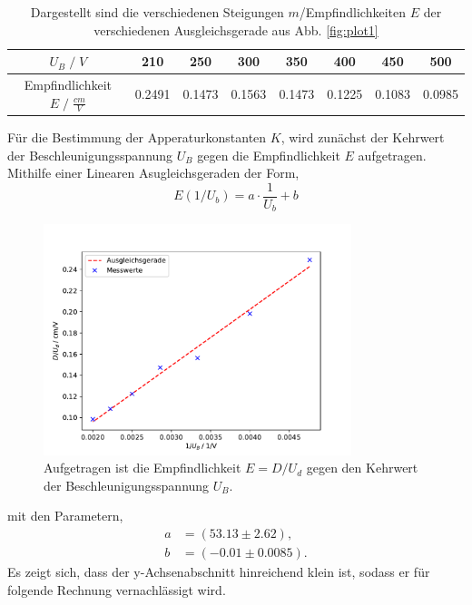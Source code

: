 \begin{table}
    \centering
    \begin{tabular}{c | c c c c c c c}
        \toprule
        $U_B\;/\;V$&210&250&300&350&400&450&500\\
        \midrule
        Empfindlichkeit $E\;/\;\frac{cm}{V}$& 0.2491& 0.1473& 0.1563& 0.1473& 0.1225& 0.1083& 0.0985\\
        \bottomrule
    \end{tabular}
    \caption{Dargestellt sind die verschiedenen Steigungen $m$/Empfindlichkeiten $E$ der verschiedenen 
    Ausgleichsgerade aus Abb. \ref{fig:plot1}}
    \label{tab:tab1}
\end{table}
\newpage
Für die Bestimmung der Apperaturkonstanten $K$, wird zunächst der Kehrwert der Beschleunigungsspannung $U_B$
gegen die Empfindlichkeit $E$ aufgetragen. Mithilfe einer Linearen Asugleichsgeraden der Form,
\begin{equation}
    E(1/U_b) = a\cdot \frac{1}{U_b} + b  \nonumber
\end{equation}
\begin{figure}[H]
    \centering
    \includegraphics[width=0.8\textwidth]{plots/all2.pdf}
    \caption{Aufgetragen ist die Empfindlichkeit $E=D/U_d$ gegen den Kehrwert
    der Beschleunigungsspannung $U_B$.}
\end{figure}
mit den Parametern,
\begin{align}
    a&=(53.13\pm2.62),\\
    b&=(-0.01\pm0.0085).
    \label{eqn:y}
\end{align}
Es zeigt sich, dass der y-Achsenabschnitt hinreichend klein ist, sodass er für folgende Rechnung vernachlässigt wird.\\

